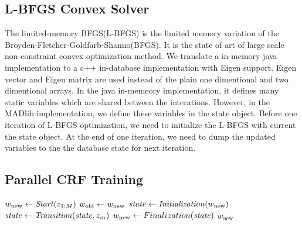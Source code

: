 \subsection{L-BFGS Convex Solver}
The limited-memory BFGS(L-BFGS) is the limited memory variation of the Broyden-Fletcher-Goldfarb-Shanno(BFGS).
It is the state of art of large scale non-constraint convex optimization method.
We translate a in-memory java implementation to a c++ in-database implementation with Eigen support.
Eigen vector and Eigen matrix are used instead of the plain one dimentional and two dimentional arrays.
In the java in-memeory implementation, it defines many static variables which are shared between the interations.
However, in the MADlib implementation, we define these variables in the state object.
Before one iteration of L-BFGS optimization, we need to initialize the L-BFGS with current the state object. 
At the end of one iteration, we need to dump the updated variables to the the database state for next iteration.


\subsection{Parallel CRF Training}
\begin{algorithm} \label{alg:CRF training}
\begin{algorithmic}[1]
	\State $w_\text{new} \leftarrow \mathit{Start}(z_{1:M})$
	\Repeat
        \State $w_\text{old} \leftarrow w_\text{new}$
        \State $\mathit{state} \leftarrow \mathit{Initialization}(w_\text{new})$
		 
			\State $\mathit{state} \leftarrow \mathit{Transition}(\mathit{state}, z_m)$
		\EndFor
		\State $w_\text{new} \leftarrow Finalization(\mathit{state})$ 
    \State \Return $w_\text{new}$
\end{algorithmic}
\end{algorithm}

